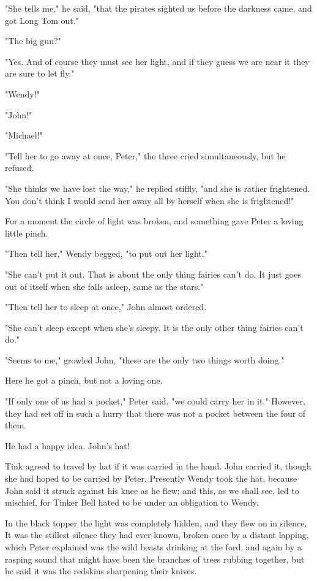 "She tells me," he said, "that the pirates sighted us before the darkness
came, and got Long Tom out."


"The big gun?"


"Yes. And of course they must see her light, and if they guess we are near
it they are sure to let fly."


"Wendy!"


"John!"


"Michael!"


"Tell her to go away at once, Peter," the three cried simultaneously, but
he refused.


"She thinks we have lost the way," he replied stiffly, "and she is rather
frightened. You don't think I would send her away all by herself when she
is frightened!"


For a moment the circle of light was broken, and something gave Peter a
loving little pinch.


"Then tell her," Wendy begged, "to put out her light."


"She can't put it out. That is about the only thing fairies can't do. It
just goes out of itself when she falls asleep, same as the stars."


"Then tell her to sleep at once," John almost ordered.


"She can't sleep except when she's sleepy. It is the only other thing
fairies can't do."


"Seems to me," growled John, "these are the only two things worth doing."


Here he got a pinch, but not a loving one.


"If only one of us had a pocket," Peter said, "we could carry her in it."
However, they had set off in such a hurry that there was not a pocket
between the four of them.


He had a happy idea. John's hat!


Tink agreed to travel by hat if it was carried in the hand. John carried
it, though she had hoped to be carried by Peter. Presently Wendy took the
hat, because John said it struck against his knee as he flew; and this, as
we shall see, led to mischief, for Tinker Bell hated to be under an
obligation to Wendy.


In the black topper the light was completely hidden, and they flew on in
silence. It was the stillest silence they had ever known, broken once by a
distant lapping, which Peter explained was the wild beasts drinking at the
ford, and again by a rasping sound that might have been the branches of
trees rubbing together, but he said it was the redskins sharpening their
knives.


